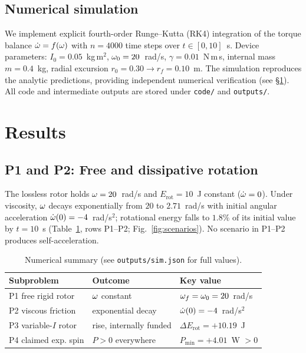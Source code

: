 \documentclass[11pt,twoside]{article}
\begin{document}
\subsection{Numerical simulation}
\label{ssec:num}
We implement explicit fourth-order Runge--Kutta (RK4) integration of the
torque balance $\dot{\omega}=f(\omega)$ with $n=4000$ time steps over $t\in[0,10]$~s.
Device parameters: $I_0=0.05$~kg\,m$^2$, $\omega_0=20$~rad/s, $\gamma=0.01$~N\,m\,s,
internal mass $m=0.4$~kg, radial excursion $r_0=0.30\to r_f=0.10$~m. The
simulation reproduces the analytic predictions, providing independent
numerical verification (see \S\ref{sec:results}). All code and intermediate
outputs are stored under \texttt{code/} and \texttt{outputs/}.

\section{Results}
\label{sec:results}
\subsection{P1 and P2: Free and dissipative rotation}
The lossless rotor holds $\omega=20$~rad/s and $E_{\mathrm{rot}}=10$~J constant
($\dot{\omega}=0$). Under viscosity, $\omega$ decays exponentially from $20$ to
$2.71$~rad/s with initial angular acceleration $\dot{\omega}(0)=-4$~rad/s$^2$;
rotational energy falls to $1.8\%$ of its initial value by $t=10$~s
(Table~\ref{tab:summary}, rows P1--P2; Fig.~\ref{fig:scenarios}). No scenario in
P1--P2 produces self-acceleration.

\begin{table}[t]
\centering
\caption{Numerical summary (see \texttt{outputs/sim.json} for full values).}
\label{tab:summary}
\begin{tabular}{lll}
\toprule
Subproblem & Outcome & Key value \\
\midrule
P1 free rigid rotor   & $\omega$ constant        & $\omega_f=\omega_0=20$~rad/s \\
P2 viscous friction   & exponential decay     & $\dot{\omega}(0)=-4$~rad/s$^2$ \\
P3 variable-$I$ rotor & rise, internally funded & $\Delta E_{\mathrm{rot}}=+10.19$~J \\
P4 claimed exp. spin  & $P>0$ everywhere      & $P_{\min}=+4.01$~W $>0$ \\
\bottomrule
\end{tabular}
\end{table}
\end{document}
